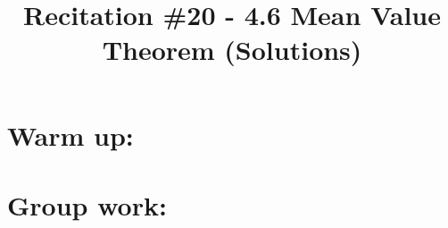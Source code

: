 \documentclass[nooutcomes]{ximera}
\title{Recitation \#20 - 4.6 Mean Value Theorem (Solutions)}
\begin{document}
\begin{abstract}		\end{abstract}
\maketitle

\section*{Warm up:} 

		\begin{freeResponse}
		
		\end{freeResponse}	
		
		
		

	
	
	
	
	

\section*{Group work:}



\begin{problem}

		\begin{freeResponse}
		
		\end{freeResponse}
		
		
\end{problem}
















\begin{problem}

		\begin{freeResponse}
		
		\end{freeResponse}
		
		
		

\end{problem}
	
	
	
	
	
	
	
	
			
			

\begin{problem}

		\begin{freeResponse}
			
		\end{freeResponse}
			
			
		
\end{problem}
\end{document}

